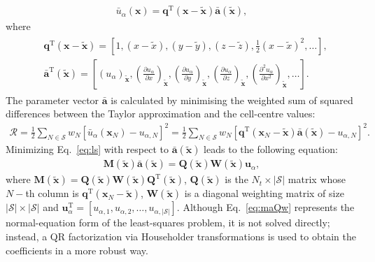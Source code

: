 \documentclass[review,3p]{elsarticle}
\newcommand{\bb}{\boldsymbol}
\begin{document}
%
\begin{eqnarray}
	\bar{u}_\alpha(\bb{x}) = \mathbf{q}^{\mathrm{T}}(\bb{x}-\tilde{\bb{x}})\bar{\mathbf{a}}(\tilde{\bb{x}}),
\end{eqnarray}
%
where
%
\begin{eqnarray}\label{eq:qAnda}
	\begin{split}
		&\mathbf{q}^{\mathrm{T}}(\bb{x}-\tilde{\bb{x}}) = \left[1, (x-\tilde{x}), (y-\tilde{y}), (z-\tilde{z}), \frac{1}{2}(x-\tilde{x})^2, \dots \right],\\
		& \bar{\mathbf{a}}^{\mathrm{T}}(\tilde{\bb{x}}) = \left[(u_\alpha)_{\tilde{\bb{x}}}, \left(\frac{\partial u_\alpha}{\partial x}\right)_{\tilde{\bb{x}}},
		\left(\frac{\partial u_\alpha}{\partial y}\right)_{\tilde{\bb{x}}},
		\left(\frac{\partial u_\alpha}{\partial z}\right)_{\tilde{\bb{x}}},
		\left(\frac{\partial^2 u_\alpha}{\partial x^2}\right)_{\tilde{\bb{x}}},
		\dots  \right].
	\end{split}
\end{eqnarray}
%
The parameter vector $\bar{\mathbf{a}}$ is calculated by minimising the weighted sum of squared differences between the Taylor approximation and the cell-centre values:
%
\begin{eqnarray}\label{eq:ls}
	\mathcal{R} = \frac{1}{2} \sum_{N \in \mathcal{S}} w_N \left [ \bar{u}_\alpha(\bb{x}_N) - u_{\alpha,N}\right]^2 =\frac{1}{2} \sum_{N \in \mathcal{S}} w_N \left [ \mathbf{q}^{\mathrm{T}}(\bb{x}_N-\tilde{\bb{x}})\bar{\mathbf{a}}(\tilde{\bb{x}}) - u_{\alpha,N}\right]^2.
\end{eqnarray}
%
Minimizing Eq.~\eqref{eq:ls} with respect to $\bar{\mathbf{a}}(\tilde{\boldsymbol{x}})$ leads to the following equation:
%
\begin{eqnarray}\label{eq:maQw}
	\mathbf{{M}}(\tilde{\bb{x}}) \mathbf{\bar{a}}(\tilde{\bb{x}}) = \mathbf{{Q}}(\tilde{\bb{x}}) \mathbf{{W}}(\tilde{\bb{x}}) \mathbf{u}_\alpha,
\end{eqnarray}
%
where $\mathbf{M}(\tilde{\bb{x}})=\mathbf{Q}(\tilde{\bb{x}})\mathbf{W}(\tilde{\bb{x}})\mathbf{Q}^{\mathrm{T}}(\tilde{\bb{x}})$, $\mathbf{Q}(\tilde{\bb{x}})$ is the $N_t \times |\mathcal{S}|$ matrix whose $N-$th column is $\mathbf{q}^{\mathrm{T}}(\bb{x}_N-\tilde{\bb{x}})$, $\mathbf{W}(\tilde{\bb{x}})$ is a diagonal weighting matrix of size $|\mathcal{S}| \times |\mathcal{S}|$ and $\mathbf{u}^\text{T}_\alpha=\left[u_{\alpha,1}, u_{\alpha,2},\dots,u_{\alpha,|\mathcal{S}|} \right] $.
Although Eq.~\eqref{eq:maQw} represents the normal-equation form of the least-squares problem, it is not solved directly; instead, a QR factorization via Householder transformations \cite{strang2012} is used to obtain the coefficients in a more robust way.
\end{document}
